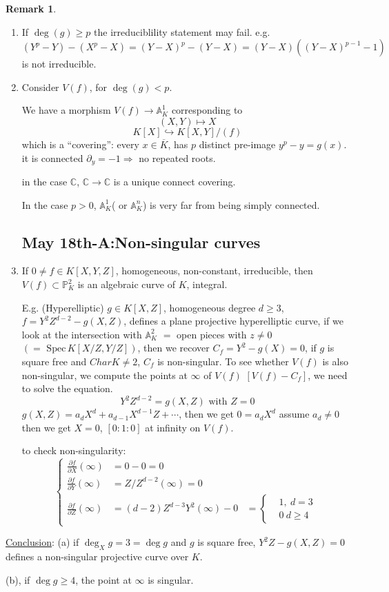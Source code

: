 \documentclass[11pt]{article}
\theoremstyle{definition}
\newtheorem{rmk}[thm]{Remark}
\newcommand{\spec}{\text{ Spec}\,}
\newcommand{\affn}{\mathbb A}
\newcommand{\proj}{\mathbb P}
\newcommand{\cplx}{\mathbb C}
\newcommand{\pd}{\partial}
\newcommand{\Lrta}{\Longrightarrow}
\newcommand{\lrta}{\longrightarrow}
\newcommand{\inj}{\hookrightarrow}
\begin{document}
\begin{rmk}\ 
\begin{enumerate}[label=(\arabic*)]
\item 
If $\deg(g)\geq p$ the irreduciblility statement may fail.
e.g. $(Y^p-Y)-(X^p-X)=(Y-X)^p-(Y-X)=(Y-X)((Y-X)^{p-1}-1)$ is not irreducible.

\item Consider $V(f)$, for $\deg(g)<p$.

We have a morphism $V(f)\lrta \affn^1_K$ corresponding to
 $$(X,Y)\longmapsto X$$
 $$
K[X]\inj K[X,Y]/(f)
 $$
 which is a ``covering'': every $x\in \overline{K}$, has $p$ distinct pre-image $y^p-y=g(x)$. it is connected $\pd_y=-1\Lrta $ no repeated roots.

in the case $\cplx$, $\cplx\lrta \cplx$ is a unique connect covering.

In the case $p>0$, $\affn^1_K$( or $\affn^n_K$) is very far from being simply connected.
\subsection{May 18th-A:Non-singular curves}
\item If $0\neq f\in K[X,Y,Z]$, homogeneous, non-constant, irreducible, then $V(f)\subset \proj^2_K$ is an algebraic curve of $K$, integral.

E.g. (Hyperelliptic) $g\in K[X,Z]$, homogeneous degree $d\geq 3$, $f=Y^2Z^{d-2}-g(X,Z)$, defines a plane projective hyperelliptic curve, if we look at the intersection with $\affn^2_K$ $=$ open pieces with $z\neq 0$ $(=\spec K[X/Z,Y/Z])$, then we recover $C_f=Y^2-g(X)=0$, if $g$ is square free and $Char K\neq 2$, $C_f$ is non-singular. To see whether  $V(f)$ is also non-singular, we compute the points at $\infty$ of $V(f)$ $[V(f)-C_f]$, we need to solve the equation. 
$$
Y^2 Z^{d-2}=g(X,Z) \text{ with } Z=0
$$
$g(X,Z)=a_d X^{d}+a_{d-1}X^{d-1}Z+\cdots$, then we get $0=a_d X^d$ assume $a_d\neq 0$ then we get $X=0$, $[0:1:0]$ at infinity on $V(f).$

to check non-singularity:
$$
\left\{
\begin{aligned}
\frac{\pd f}{\pd X}(\infty)&=0-0=0\\
\frac{\pd f}{\pd Y}(\infty)&=Z/Z^{d-2}(\infty)=0\\
\frac{\pd f}{\pd Z}(\infty)&=(d-2)Z^{d-3}Y^2(\infty)-0&=\left\{
\begin{aligned}
&1, \ d=3\\
&0 \ d\geq 4
\end{aligned}
\right.
\end{aligned}
\right.
$$
\end{enumerate}
\underline{Conclusion}: (a) if $\deg_X g=3=\deg g$ and $g$ is square free, $Y^2Z-g(X,Z)=0$ defines a non-singular projective curve over $K$.

(b), if $\deg g \geq 4$, the point at  $\infty $ is singular.
\end{rmk}
\end{document}
